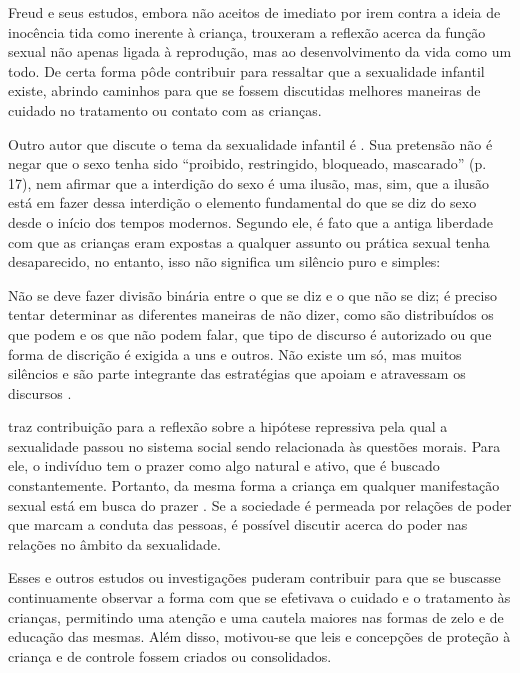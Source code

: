 Freud e seus estudos, embora não aceitos de imediato por irem contra a ideia de inocência tida como inerente à criança, trouxeram a reflexão acerca da função sexual não apenas ligada à reprodução, mas ao desenvolvimento da vida como um todo. De certa forma pôde contribuir para ressaltar que a sexualidade infantil existe, abrindo caminhos para que se fossem discutidas melhores maneiras de cuidado no tratamento ou contato com as crianças.  

Outro autor que discute o tema da sexualidade infantil é . Sua pretensão não é negar que o sexo tenha sido ``proibido, restringido, bloqueado, mascarado'' (p. 17), nem afirmar que a interdição do sexo é uma ilusão, mas, sim, que a ilusão está em fazer dessa interdição o elemento fundamental do que se diz do sexo desde o início dos tempos modernos. Segundo ele, é fato que a antiga liberdade com que as crianças eram expostas a qualquer assunto ou prática sexual tenha desaparecido, no entanto, isso não significa um silêncio puro e simples:

\begin{citacao}
	Não se deve fazer divisão binária entre o que se diz e o que não se diz; é preciso tentar determinar as diferentes maneiras de não dizer, como são distribuídos os que podem e os que não podem falar, que tipo de discurso é autorizado ou que forma de discrição é exigida a uns e outros. Não existe um só, mas muitos silêncios e são parte integrante das estratégias que apoiam e atravessam os discursos \cite[p. 30]{FOUCAULT1988}.
\end{citacao}

 traz contribuição para a reflexão sobre a hipótese repressiva pela qual a sexualidade passou no sistema social sendo relacionada às questões morais. Para ele, o indivíduo tem o prazer como algo natural e ativo, que é buscado constantemente. Portanto, da mesma forma a criança em qualquer manifestação sexual está em busca do prazer \cite{DONIZETE2010}. Se a sociedade é permeada por relações de poder que marcam a conduta das pessoas, é possível discutir acerca do poder nas relações no âmbito da sexualidade.

Esses e outros estudos ou investigações puderam contribuir para que se buscasse continuamente observar a forma com que se efetivava o cuidado e o tratamento às crianças, permitindo uma atenção e uma cautela maiores nas formas de zelo e de educação das mesmas. Além disso, motivou-se que leis e concepções de proteção à criança e de controle fossem criados ou consolidados.

